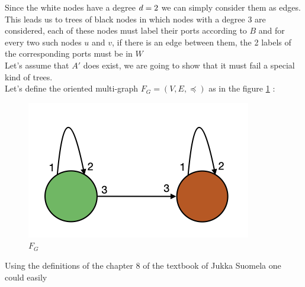 Since the white nodes have a degree $d = 2$ we can simply consider them as edges. This leads us to trees of black nodes in which nodes with a degree 3 are considered, each of these nodes must label their ports according to $B$ and for every two such nodes $u$ and $v$, if there is an edge between them, the 2 labels of the corresponding ports must be in $W$\\
Let's assume that $A'$ does exist, we are going to show that it must fail a special kind of trees.\\
Let's define the oriented multi-graph $F_G = (V, E,\preceq)$ as in the figure  \ref{fig:cv1} :\\
\begin{figure}[htb]
    \centering
    \includegraphics[scale = 0.6]{cover_map.png}
    \caption{$F_G$}
    \label{fig:cv1}
\end{figure}
Using the definitions of the chapter 8 of the textbook of Jukka Suomela \cite{3} one could easily
